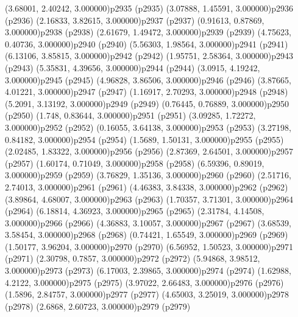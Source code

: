 \psPoint(3.68001, 2.40242, 3.000000){p2935}
\psdot(p2935)
\psPoint(3.07888, 1.45591, 3.000000){p2936}
\psdot(p2936)
\psPoint(2.16833, 3.82615, 3.000000){p2937}
\psdot(p2937)
\psPoint(0.91613, 0.87869, 3.000000){p2938}
\psdot(p2938)
\psPoint(2.61679, 1.49472, 3.000000){p2939}
\psdot(p2939)
\psPoint(4.75623, 0.40736, 3.000000){p2940}
\psdot(p2940)
\psPoint(5.56303, 1.98564, 3.000000){p2941}
\psdot(p2941)
\psPoint(6.13106, 3.85815, 3.000000){p2942}
\psdot(p2942)
\psPoint(1.95751, 2.58364, 3.000000){p2943}
\psdot(p2943)
\psPoint(5.35831, 4.39656, 3.000000){p2944}
\psdot(p2944)
\psPoint(3.0915, 4.19242, 3.000000){p2945}
\psdot(p2945)
\psPoint(4.96828, 3.86506, 3.000000){p2946}
\psdot(p2946)
\psPoint(3.87665, 4.01221, 3.000000){p2947}
\psdot(p2947)
\psPoint(1.16917, 2.70293, 3.000000){p2948}
\psdot(p2948)
\psPoint(5.2091, 3.13192, 3.000000){p2949}
\psdot(p2949)
\psPoint(0.76445, 0.76889, 3.000000){p2950}
\psdot(p2950)
\psPoint(1.748, 0.83644, 3.000000){p2951}
\psdot(p2951)
\psPoint(3.09285, 1.72272, 3.000000){p2952}
\psdot(p2952)
\psPoint(0.16055, 3.64138, 3.000000){p2953}
\psdot(p2953)
\psPoint(3.27198, 0.84182, 3.000000){p2954}
\psdot(p2954)
\psPoint(1.5689, 1.50131, 3.000000){p2955}
\psdot(p2955)
\psPoint(2.02485, 1.83322, 3.000000){p2956}
\psdot(p2956)
\psPoint(2.87369, 2.64501, 3.000000){p2957}
\psdot(p2957)
\psPoint(1.60174, 0.71049, 3.000000){p2958}
\psdot(p2958)
\psPoint(6.59396, 0.89019, 3.000000){p2959}
\psdot(p2959)
\psPoint(3.76829, 1.35136, 3.000000){p2960}
\psdot(p2960)
\psPoint(2.51716, 2.74013, 3.000000){p2961}
\psdot(p2961)
\psPoint(4.46383, 3.84338, 3.000000){p2962}
\psdot(p2962)
\psPoint(3.89864, 4.68007, 3.000000){p2963}
\psdot(p2963)
\psPoint(1.70357, 3.71301, 3.000000){p2964}
\psdot(p2964)
\psPoint(6.18814, 4.36923, 3.000000){p2965}
\psdot(p2965)
\psPoint(2.31784, 4.14508, 3.000000){p2966}
\psdot(p2966)
\psPoint(4.36883, 3.10057, 3.000000){p2967}
\psdot(p2967)
\psPoint(3.68539, 3.58454, 3.000000){p2968}
\psdot(p2968)
\psPoint(0.74421, 1.65549, 3.000000){p2969}
\psdot(p2969)
\psPoint(1.50177, 3.96204, 3.000000){p2970}
\psdot(p2970)
\psPoint(6.56952, 1.50523, 3.000000){p2971}
\psdot(p2971)
\psPoint(2.30798, 0.7857, 3.000000){p2972}
\psdot(p2972)
\psPoint(5.94868, 3.98512, 3.000000){p2973}
\psdot(p2973)
\psPoint(6.17003, 2.39865, 3.000000){p2974}
\psdot(p2974)
\psPoint(1.62988, 4.2122, 3.000000){p2975}
\psdot(p2975)
\psPoint(3.97022, 2.66483, 3.000000){p2976}
\psdot(p2976)
\psPoint(1.5896, 2.84757, 3.000000){p2977}
\psdot(p2977)
\psPoint(4.65003, 3.25019, 3.000000){p2978}
\psdot(p2978)
\psPoint(2.6868, 2.60723, 3.000000){p2979}
\psdot(p2979)
